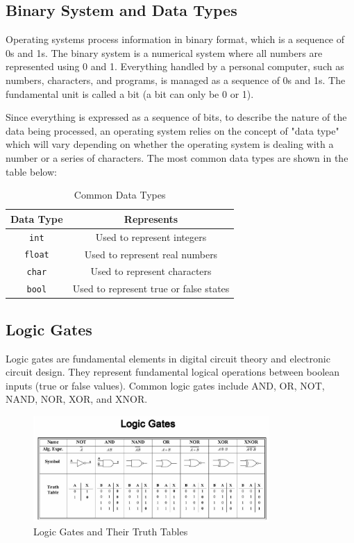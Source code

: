 \subsection{Binary System and Data Types}
Operating systems process information in binary format, which is a sequence of 0s and 1s. The binary system is a numerical system where all numbers are represented using 0 and 1. Everything handled by a personal computer, such as numbers, characters, and programs, is managed as a sequence of 0s and 1s. The fundamental unit is called a bit (a bit can only be 0 or 1).

Since everything is expressed as a sequence of bits, to describe the nature of the data being processed, an operating system relies on the concept of "data type" which will vary depending on whether the operating system is dealing with a number or a series of characters. The most common data types are shown in the table below:

\begin{table}[h]
\centering
\begin{tabular}{|c|c|}
\hline
\textbf{Data Type} & \textbf{Represents} \\
\hline
\texttt{int} & Used to represent integers \\
\texttt{float} & Used to represent real numbers \\
\texttt{char} & Used to represent characters \\
\texttt{bool} & Used to represent true or false states \\
\hline
\end{tabular}
\caption{Common Data Types}
\label{table:data-types}
\end{table}

\subsection{Logic Gates}
Logic gates are fundamental elements in digital circuit theory and electronic circuit design. They represent fundamental logical operations between boolean inputs (true or false values). Common logic gates include AND, OR, NOT, NAND, NOR, XOR, and XNOR.

\begin{figure}[h]
\centering
\includegraphics[width=0.8\textwidth]{images/logic_gates.png}
\caption{Logic Gates and Their Truth Tables}
\label{figure:logic-gates}
\end{figure}


